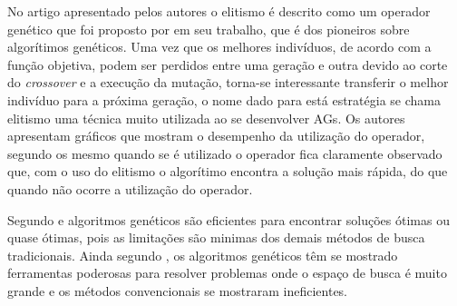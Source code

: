 \documentclass{abntpuc}
\begin{document}
No artigo apresentado pelos autores \cite{de1999introduccao} o elitismo é descrito como um operador genético que foi proposto por \cite{DeJong} em seu trabalho, que é dos pioneiros sobre algorítimos genéticos. Uma vez que os melhores indivíduos, de acordo com a função objetiva, podem ser perdidos entre uma geração e outra devido ao corte do \textit{crossover} e a execução da mutação, torna-se interessante transferir o melhor indivíduo para a próxima geração, o nome dado para está estratégia se chama elitismo uma técnica muito utilizada ao se desenvolver AGs. Os autores apresentam gráficos que mostram o desempenho da utilização do operador, segundo os mesmo quando se é utilizado o operador fica claramente observado que, com o uso do elitismo o algorítimo encontra a solução mais rápida, do que quando não ocorre a utilização do operador.

Segundo \cite{hamawaki2011geraccao} e \cite{oliveira2005algoritmo} algoritmos genéticos são eficientes para encontrar soluções ótimas ou quase ótimas, pois as limitações são minimas dos demais métodos de busca tradicionais. Ainda segundo \cite{oliveira2005algoritmo}, os algoritmos genéticos têm se mostrado ferramentas poderosas para resolver problemas onde o espaço de busca é muito grande e os métodos convencionais se mostraram ineficientes.\par


%
\end{document}
